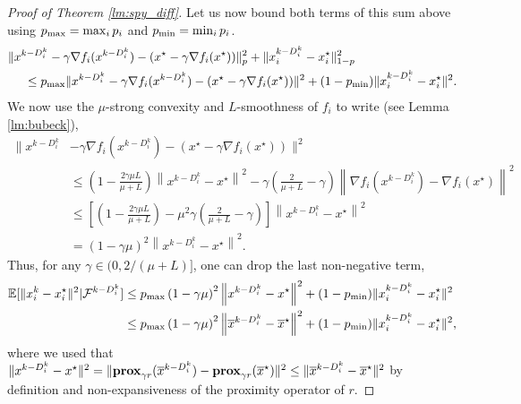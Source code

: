 \begin{proof}[Proof of Theorem \ref{lm:spy_diff}]
Let us now bound both terms of this sum above using $p_{\max} = \max_i p_i$ and $p_{\min} = \min_i p_i$.
\begin{align*}
   &  \| x^{k-D_i^k} - \gamma \nabla f_i(x^{k-D_i^k})  - (  {x}^{\star} - \gamma \nabla f_i(x^\star) ) \|^2_p     + \| x_{i}^{k-D_i^k} - {x}_{i}^{\star}\|^2_{1-p}\\
    & ~~~~ \leq  p_{\max}\| x^{k-D_i^k} - \gamma \nabla f_i(x^{k-D_i^k})  - (  {x}^{\star} - \gamma \nabla f_i(x^\star) ) \|^2  + (1-p_{\min})\| x_{i}^{k-D_i^k} - {x}_{i}^{\star}\|^2.
\end{align*}
We now use the $\mu$-strong convexity and $L$-smoothness of $f_i$ to write (see Lemma \ref{lm:bubeck}),
\begin{align*}
    \| x^{k-D_i^k} &- \gamma \nabla f_i(x^{k-D_i^k})  - (  {x}^{\star} - \gamma \nabla f_i(x^\star) ) \|^2\\
    & \leq \left( 1 - \frac{2\gamma \mu L}{\mu+L} \right) \left\| x^{k-D_i^k} - x^\star \right\|^2  - \gamma \left( \frac{2}{\mu + L} - \gamma\right)   \left\|\nabla f_i(x^{k-D_i^k}) - \nabla f_i(x^\star) \right\|^2 \\
        & \leq \left[ \left( 1 - \frac{2\gamma \mu L}{\mu+L} \right) - \mu^2 \gamma \left( \frac{2}{\mu + L} - \gamma\right)  \right] \left\| x^{k-D_i^k} - x^\star \right\|^2  \\
        &=     \left( 1 - \gamma \mu \right)^2 \left\| x^{k-D_i^k} - x^\star \right\|^2.
\end{align*}
Thus, for any $\gamma \in (0,2/(\mu+L)]$, one can drop the last non-negative term, 
\begin{align*}
    \mathbb{E}[\|x_i^k - x_i^\star\|^2 | \mathcal{F}^{k-D_i^k} ]&\leq
     p_{\max} \left(1-\gamma\mu\right)^2 \left\| x^{k-D_i^k} - x^\star \right\|^2 + (1-p_{\min}) \| x_{i}^{k-D_i^k} - {x}_{i}^{\star}\|^2 \\
    &\leq p_{\max} \left(1-\gamma\mu\right)^2 \left\| \overline{x}^{k-D_i^k} - \overline{x}^\star \right\|^2 + (1-p_{\min}) \| x_{i}^{k-D_i^k} - {x}_{i}^{\star}\|^2,
\end{align*}
where we used that $\| x^{k-D_i^k} - x^\star \|^2 = \| \mathbf{prox}_{\gamma r} (\overline{x}^{k-D_i^k}) - \mathbf{prox}_{\gamma r}(\overline{x}^\star) \|^2 \leq \| \overline{x}^{k-D_i^k} - \overline{x}^\star \|^2 $ by definition and non-expansiveness of the proximity operator of $r$. 



\end{proof}
